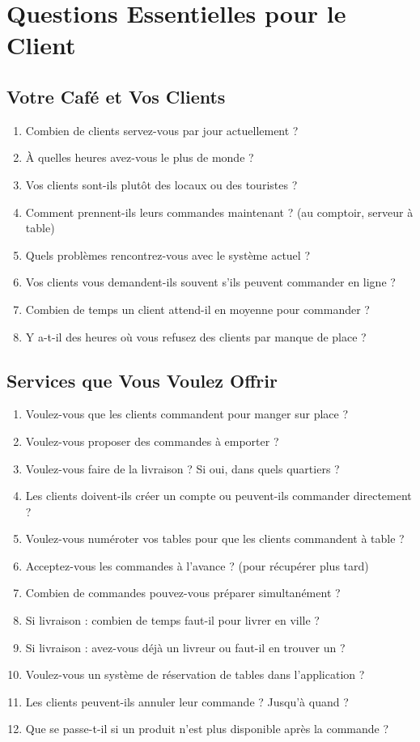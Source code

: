 \documentclass[11pt,a4paper]{article}
\begin{document}
\section{Questions Essentielles pour le Client}

\subsection{Votre Café et Vos Clients}

\begin{enumerate}
    \item Combien de clients servez-vous par jour actuellement ?
    \item À quelles heures avez-vous le plus de monde ?
    \item Vos clients sont-ils plutôt des locaux ou des touristes ?
    \item Comment prennent-ils leurs commandes maintenant ? (au comptoir, serveur à table)
    \item Quels problèmes rencontrez-vous avec le système actuel ?
    \item Vos clients vous demandent-ils souvent s'ils peuvent commander en ligne ?
    \item Combien de temps un client attend-il en moyenne pour commander ?
    \item Y a-t-il des heures où vous refusez des clients par manque de place ?
\end{enumerate}

\subsection{Services que Vous Voulez Offrir}

\begin{enumerate}[resume]
    \item Voulez-vous que les clients commandent pour manger sur place ?
    \item Voulez-vous proposer des commandes à emporter ?
    \item Voulez-vous faire de la livraison ? Si oui, dans quels quartiers ?
    \item Les clients doivent-ils créer un compte ou peuvent-ils commander directement ?
    \item Voulez-vous numéroter vos tables pour que les clients commandent à table ?
    \item Acceptez-vous les commandes à l'avance ? (pour récupérer plus tard)
    \item Combien de commandes pouvez-vous préparer simultanément ?
    \item Si livraison : combien de temps faut-il pour livrer en ville ?
    \item Si livraison : avez-vous déjà un livreur ou faut-il en trouver un ?
    \item Voulez-vous un système de réservation de tables dans l'application ?
    \item Les clients peuvent-ils annuler leur commande ? Jusqu'à quand ?
    \item Que se passe-t-il si un produit n'est plus disponible après la commande ?
\end{enumerate}
\end{document}
